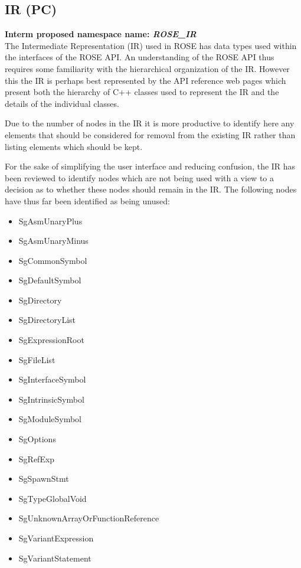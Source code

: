 \begin{enumerate}
\end{enumerate}


\subsection{IR (PC)}
{\bf Interm proposed namespace name: {\em ROSE\_IR}} \\
   The Intermediate Representation (IR) used in ROSE has data types used
within the interfaces of the ROSE API.  An understanding of the ROSE API 
thus requires some familiarity with the hierarchical organization of the 
IR.  However this the IR is perhaps best represented by the API reference
web pages which present both the hierarchy of C++ classes 
used to represent the IR and the details of the individual classes.

Due to the number of nodes in the IR it is more productive to identify
here any elements that should be considered for removal from the
existing IR rather than listing elements which should be kept.

For the sake of simplifying the user interface and reducing confusion,
the IR has been reviewed to identify nodes which are not being used
with a view to a decision as to whether these nodes should remain
in the IR.  The following nodes have thus far been identified as
being unused:
\begin{itemize}
\item SgAsmUnaryPlus
\item SgAsmUnaryMinus
\item SgCommonSymbol
\item SgDefaultSymbol
\item SgDirectory
\item SgDirectoryList
\item SgExpressionRoot
\item SgFileList
\item SgInterfaceSymbol
\item SgIntrinsicSymbol
\item SgModuleSymbol
\item SgOptions
\item SgRefExp
\item SgSpawnStmt
\item SgTypeGlobalVoid
\item SgUnknownArrayOrFunctionReference
\item SgVariantExpression
\item SgVariantStatement
\end{itemize}

